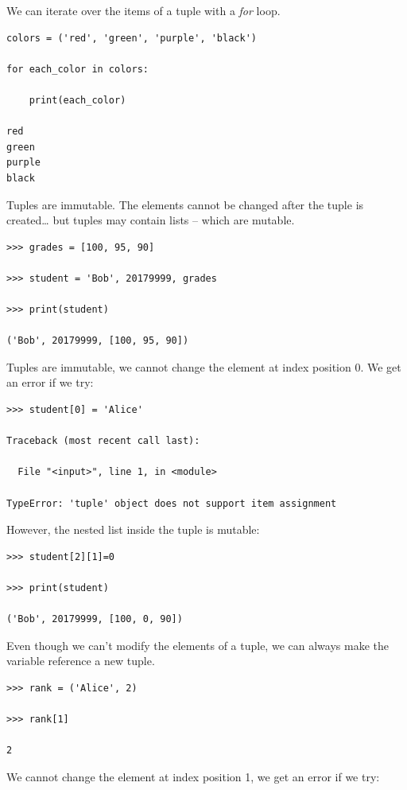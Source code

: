 \documentclass{article}
\begin{document}
We can iterate over the items of a tuple with a \textit{for} loop.

\begin{lstlisting}
colors = ('red', 'green', 'purple', 'black')

for each_color in colors:

    print(each_color)

red
green
purple
black
\end{lstlisting}

Tuples are immutable.  The elements cannot be changed after the tuple is  created… but tuples may contain lists – which are mutable.

\begin{lstlisting}
>>> grades = [100, 95, 90]

>>> student = 'Bob', 20179999, grades

>>> print(student)

('Bob', 20179999, [100, 95, 90])
\end{lstlisting}

Tuples are immutable, we cannot change the element at index position 0.  We get an error if we try:

\begin{lstlisting}
>>> student[0] = 'Alice'

Traceback (most recent call last):

  File "<input>", line 1, in <module>

TypeError: 'tuple' object does not support item assignment
\end{lstlisting}

However, the nested list inside the tuple is mutable:

\begin{lstlisting}
>>> student[2][1]=0

>>> print(student)

('Bob', 20179999, [100, 0, 90])
\end{lstlisting}

Even though we can't modify the elements of a tuple, we can always make the  variable reference a new tuple. 

\begin{lstlisting}
>>> rank = ('Alice', 2)

>>> rank[1]

2
\end{lstlisting}

 We cannot change the element at index position 1, we get an error if we try:
\end{document}
